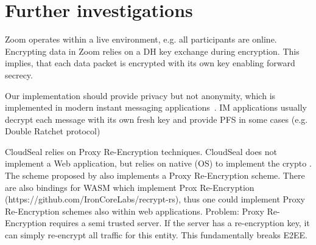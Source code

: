 \documentclass[../main.txt]{subfiles}
\begin{document}
\section{Further investigations}


Zoom operates within a live environment, e.g. all participants are online. 
Encrypting data in Zoom relies on a DH key exchange during encryption. 
This implies, that each data packet is encrypted with its own key enabling forward secrecy. \cite{Isobe2021}

Our implementation should provide privacy but not anonymity, which is implemented in modern instant messaging applications~\cite{Akinbi2021}. 
IM applications usually decrypt each message with its own fresh key and provide PFS in some cases (e.g. Double Ratchet protocol)

CloudSeal relies on Proxy Re-Encryption techniques.
CloudSeal does not implement a Web application, but relies on native (OS) to implement the crypto \cite{Xiong2012}.
The scheme proposed by \citeauthor{Hoerandner2020} also implements a Proxy Re-Encryption scheme. \cite{Hoerandner2020}
There are also bindings for WASM which implement Prox Re-Encryption (https://github.com/IronCoreLabs/recrypt-rs), thus one could implement Proxy Re-Encryption schemes also within web applications.
Problem: Proxy Re-Encryption requires a semi trusted server.
If the server has a re-encryption key, it can simply re-encrypt all traffic for this entity.
This fundamentally breaks E2EE.
\end{document}
